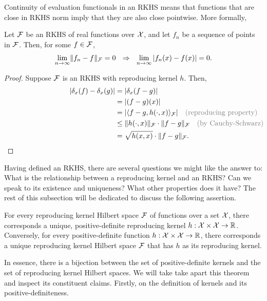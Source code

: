 Continuity of evaluation functionals in an RKHS means that functions that are close in RKHS norm imply that they are also close pointwise.
More formally,

\begin{corollary}\label{thm:normpointconv}
  Let ${\mathcal F}$ be an RKHS of real functions over ${\mathcal X}$, and let $f_n$ be a sequence of points in ${\mathcal F}$.
  Then, for some $f\in{\mathcal F}$,
  \[
    \lim_{n\to\infty} \norm{f_n - f}_\cF = 0 \ \ \Rightarrow \ \ \lim_{n\to\infty} |f_n(x) - f(x)| = 0.
  \]
\end{corollary}

\begin{proof}
  Suppose ${\mathcal F}$ is an RKHS with reproducing kernel $h$.
  Then,
  \begin{align*}
    |\delta_x(f) - \delta_x(g)| 
    &= |\delta_x(f-g)| \\
    &= |(f-g)(x)|  \\
    &= |\ip{f-g,h(\cdot,x)}_\cF| \hspace{1em} \rlap{\color{gray} (reproducing property)} \\
    &\leq \norm{h(\cdot,x)}_\cF \cdot \norm{f-g}_\cF \hspace{1em} \rlap{\color{gray} (by Cauchy-Schwarz)} \\
    &= \sqrt{h(x,x)}\cdot \norm{f-g}_\cF.
  \end{align*}
\end{proof}

Having defined an RKHS, there are several questions we might like the answer to: What is the relationship between a reproducing kernel and an RKHS? Can we speak to its existence and uniqueness? What other properties does it have?
The rest of this subsection will be dedicated to discuss the following assertion.

\begin{theorem}\label{thm:rkhsunique}
  For every reproducing kernel Hilbert space ${\mathcal F}$ of functions over a set ${\mathcal X}$, there corresponds a unique, positive-definite reproducing kernel $h:{\mathcal X}\times{\mathcal X}\to\mathbb{R}$.
  Conversely, for every positive-definite function $h:{\mathcal X}\times{\mathcal X}\to\mathbb{R}$, there corresponds a unique reproducing kernel Hilbert space ${\mathcal F}$ that has $h$ as its reproducing kernel.
\end{theorem}

In essence, there is a bijection between the set of positive-definite kernels and the set of reproducing kernel Hilbert spaces.
We will take take apart this theorem and inspect its constituent claims.
Firstly, on the definition of kernels and its positive-definiteness.

